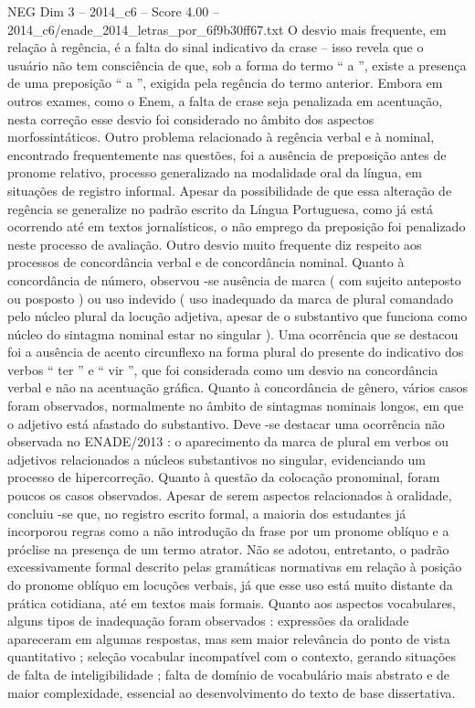 \begin{textsample}{NEG Dim 3 – 2014\_c6 – Score 4.00 – 2014\_c6/enade\_2014\_letras\_por\_6f9b30ff67.txt}
O desvio mais frequente, em relação à regência, é a falta do sinal indicativo da crase – isso revela que o usuário não tem consciência de que, sob a forma do termo “ a ”, existe a presença de uma preposição “ a ”, exigida pela regência do termo anterior.
Embora em outros exames, como o Enem, a falta de crase seja penalizada em acentuação, nesta correção esse desvio foi considerado no âmbito dos aspectos morfossintáticos.
Outro problema relacionado à regência verbal e à nominal, encontrado frequentemente nas questões, foi a ausência de preposição antes de pronome relativo, processo generalizado na modalidade oral da língua, em situações de registro informal.
Apesar da possibilidade de que essa alteração de regência se generalize no padrão escrito da Língua Portuguesa, como já está ocorrendo até em textos jornalísticos, o não emprego da preposição foi penalizado neste processo de avaliação.
Outro desvio muito frequente diz respeito aos processos de concordância verbal e de concordância nominal.
Quanto à concordância de número, observou -se ausência de marca ( com sujeito anteposto ou posposto ) ou uso indevido ( uso inadequado da marca de plural comandado pelo núcleo plural da locução adjetiva, apesar de o substantivo que funciona como núcleo do sintagma nominal estar no singular ).
Uma ocorrência que se destacou foi a ausência de acento circunflexo na forma plural do presente do indicativo dos verbos “ ter ” e “ vir ”, que foi considerada como um desvio na concordância verbal e não na acentuação gráfica.
Quanto à concordância de gênero, vários casos foram observados, normalmente no âmbito de sintagmas nominais longos, em que o adjetivo está afastado do substantivo.
Deve -se destacar uma ocorrência não observada no ENADE/2013 : o aparecimento da marca de plural em verbos ou adjetivos relacionados a núcleos substantivos no singular, evidenciando um processo de hipercorreção.
Quanto à questão da colocação pronominal, foram poucos os casos observados.
Apesar de serem aspectos relacionados à oralidade, concluiu -se que, no registro escrito formal, a maioria dos estudantes já incorporou regras como a não introdução da frase por um pronome oblíquo e a próclise na presença de um termo atrator.
Não se adotou, entretanto, o padrão excessivamente formal descrito pelas gramáticas normativas em relação à posição do pronome oblíquo em locuções verbais, já que esse uso está muito distante da prática cotidiana, até em textos mais formais.
Quanto aos aspectos vocabulares, alguns tipos de inadequação foram observados : expressões da oralidade apareceram em algumas respostas, mas sem maior relevância do ponto de vista quantitativo ; seleção vocabular incompatível com o contexto, gerando situações de falta de inteligibilidade ; falta de domínio de vocabulário mais abstrato e de maior complexidade, essencial ao desenvolvimento do texto de base dissertativa.

\end{textsample}
